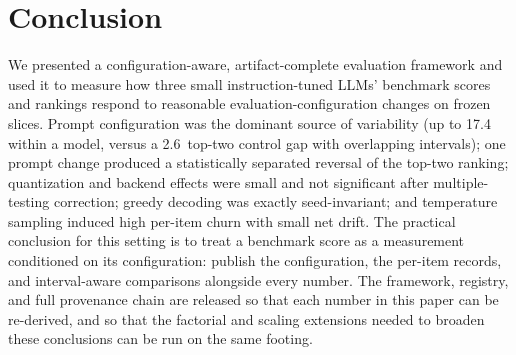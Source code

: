 \section{Conclusion}
\label{sec:conclusion}
We presented a configuration-aware, artifact-complete evaluation framework
and used it to measure how three small instruction-tuned LLMs' benchmark
scores and rankings respond to reasonable evaluation-configuration changes
on frozen slices. Prompt configuration was the dominant source of
variability (up to 17.4\,\pp{} within a model, versus a 2.6\,\pp{} top-two
control gap with overlapping intervals); one prompt change produced a
statistically separated reversal of the top-two ranking; quantization and
backend effects were small and not significant after multiple-testing
correction; greedy decoding was exactly seed-invariant; and temperature
sampling induced high per-item churn with small net drift. The practical
conclusion for this setting is to treat a benchmark score as a measurement
conditioned on its configuration: publish the configuration, the per-item
records, and interval-aware comparisons alongside every number. The
framework, registry, and full provenance chain are released so that each
number in this paper can be re-derived, and so that the factorial and
scaling extensions needed to broaden these conclusions can be run on the
same footing.



